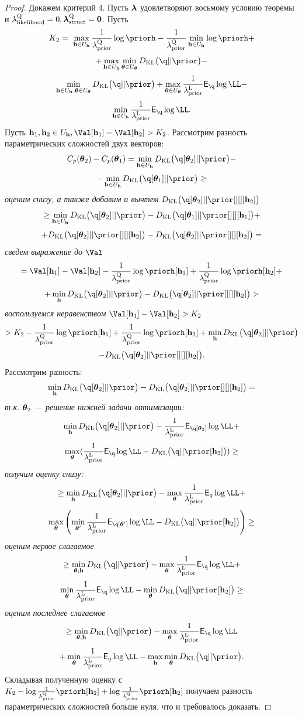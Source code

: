 \begin{proof}
Докажем критерий 4. 
Пусть $\boldsymbol{\lambda}$ удовлетворяют восьмому условию теоремы и $\lambda_\text{likelihood}^\text{Q} = 0, \boldsymbol{\lambda}_\text{struct}^\text{Q} = \mathbf{0}$.
Пусть 
\[
K_2 =  \max_{\h \in \Uh} \frac{1}{\lamCQ}\log \priorh  - \frac{1}{\lamCQ}\min_{\h \in \Uh} \log \priorh +
\]
\[
+ \max_{\h \in \Uh} \min_{\teta \in \Uteta} \KL{\q}{\prior} - 
\]
\[
\min_{\h \in \Uh, \teta \in \Uteta} \KL{\q}{\prior} + \max_{\teta \in \Uteta} \frac{1}{\lamCL} \E_{\q}\log \LL - 
\]
\[
\min_{\h \in \Uh} \frac{1}{\lamCL} \E_{\q} \log \LL.
\]
Пусть $\h_1, \h_2 \in \Uh, \Val[\h_1] - \Val[\h_2]>K_2$.
Рассмотрим разность параметрических сложностей двух векторов:
\[
C_p(\teta_2) - C_p(\teta_1) = \min_{\h \in \Uh} \KL{\q[\teta_2]}{\prior} - 
\]
\[
 - \min_{\h \in \Uh}\KL{\q[\teta_1]}{\prior} \geq
\]
\textit{оценим снизу, а также добавим и вычтем }$\KL{\q[\teta_2]}{\prior[][][\h_2]}$
\[
\geq   \min_{\h \in \Uh} \KL{\q[\teta_2]}{\prior} - \KL{\q[\teta_1]}{\prior[][][\h_1]} +
\]
\[
+ \KL{\q[\teta_2]}{\prior[][][\h_2]} - \KL{\q[\teta_2]}{\prior[][][\h_2]} = 
\]
\textit{сведем выражение до }$\Val$
\[
= \Val[\h_1] - \Val[\h_2] - \frac{1}{\lamCQ}\log\priorh[\h_1] + \frac{1}{\lamCQ}\log\priorh[\h_2]  +
\]
\[
+  \min_{\h}\KL{\q[\teta_2]}{\prior}  -  \KL{\q[\teta_2]}{\prior[][][\h_2]} >
\]
\textit{воспользуемся неравенством }$\Val[\h_1] - \Val[\h_2]>K_2$
\[
> K_2 - \frac{1}{\lamCQ}\log\priorh[\h_1] + \frac{1}{\lamCQ}\log \priorh[\h_2] + \min_{\h}\KL{\q[\teta_2]}{\prior} 
\]
\[
 -  \KL{\q[\teta_2]}{\prior[][][\h_2]}.
\]
Рассмотрим разность:
\[
\min_{\h}\KL{\q[\teta_2]}{\prior}  -  \KL{\q[\teta_2]}{\prior[][][\h_2]}  =
\] 
\textit{т.к. }$\boldsymbol{\theta}_2$ \textit{--- решение нижней задачи оптимизации:}
\[
\min_{\h}\KL{\q[\teta_2]}{\prior}  - \frac{1}{\lamCL}\E_{\q[\teta_2]}\log \LL + 
\]
\[
\max_{\teta} (\frac{1}{\lamCL} \E_{\q}\log \LL - \KL{\q}{\prior[\h_2]}) \geq
\]
\textit{получим оценку снизу:}
\[
\geq \min_{\h}\KL{\q[\teta_2]}{\prior} - \max_{\teta}\frac{1}{\lamCL}\E_{q} \log \LL + 
\]
\[
    \max_{\teta}\left(\min_{\teta'} \frac{1}{\lamCL} \E_{\q[\teta']} \log \LL - \KL{\q}{\prior[\h_2]} \right) \geq
\]
\textit{оценим первое слагаемое}
\[
\geq \min_{\teta,\h} \KL{\q}{\prior} - \max_{\teta}\frac{1}{\lamCL}\E_{\q} \log \LL +
\]
\[
\min_{\teta} \frac{1}{\lamCL} \E_{\q} \log \LL - \min_{\teta}\KL{\q}{\prior[\h_2]} \geq
\]
\textit{оценим последнее слагаемое}
\[
\geq \min_{\teta, \h} \KL{\q}{\prior} - \max_{\teta}\frac{1}{\lamCL} \E_{\q} \log \LL 
\]
\[
+ \min_{\teta}\frac{1}{\lamCL}\E_{q} \log \LL - \max_{\h}\min_{\teta}\KL{\q}{\prior}.
\]
Складывая полученную оценку с $K_2 -\log \frac{1}{\lamCQ}\priorh[\h_2] + \log \frac{1}{\lamCQ}\priorh[\h_2]$ получаем разность параметрических сложностей больше нуля, что и требовалось доказать.


\end{proof}
